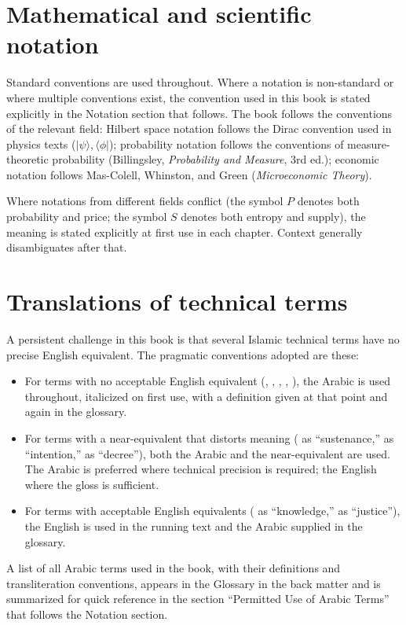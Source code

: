 \section*{Mathematical and scientific notation}

Standard conventions are used throughout. Where a notation is
non-standard or where multiple conventions exist, the convention used
in this book is stated explicitly in the Notation section that
follows. The book follows the conventions of the relevant field:
Hilbert space notation follows the Dirac convention used in physics
texts (\(|\psi\rangle, \langle\phi|\)); probability notation follows
the conventions of measure-theoretic probability (Billingsley,
\textit{Probability and Measure}, 3rd ed.); economic notation follows
Mas-Colell, Whinston, and Green (\textit{Microeconomic Theory}).

Where notations from different fields conflict (the symbol \(P\)
denotes both probability and price; the symbol \(S\) denotes both
entropy and supply), the meaning is stated explicitly at first use in
each chapter. Context generally disambiguates after that.

\section*{Translations of technical terms}

A persistent challenge in this book is that several Islamic technical
terms have no precise English equivalent. The pragmatic conventions
adopted are these:

\begin{itemize}[leftmargin=2em]
    \item For terms with no acceptable English equivalent
    (, , ,
    , ), the Arabic is used
    throughout, italicized on first use, with a definition given at
    that point and again in the glossary.
    \item For terms with a near-equivalent that distorts meaning
    ( as ``sustenance,''  as
    ``intention,''  as ``decree''), both the Arabic
    and the near-equivalent are used. The Arabic is preferred where
    technical precision is required; the English where the gloss is
    sufficient.
    \item For terms with acceptable English equivalents (
    as ``knowledge,''  as ``justice''), the English is
    used in the running text and the Arabic supplied in the glossary.
\end{itemize}

A list of all Arabic terms used in the book, with their definitions
and transliteration conventions, appears in the Glossary in the back
matter and is summarized for quick reference in the section
``Permitted Use of Arabic Terms'' that follows the Notation section.

\cleardoublepage

